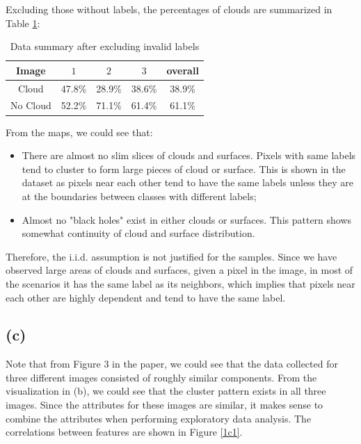 \documentclass[11pt]{article}
\theoremstyle{definition}
\begin{document}
Excluding those without labels, the percentages of clouds are summarized in Table \ref{tab2}:

\begin{table}[h]
    \centering
    \begin{tabular}{c||c|c|c|c}
    Image
    & $1$
    & $2$
    & $3$
    & overall \\
    \hline
    \hline
    Cloud
    & 47.8\%
    & 28.9\%
    & 38.6\% 
    & 38.9\% \\
    \hline
    No Cloud
    & 52.2\%
    & 71.1\%
    & 61.4\%
    & 61.1\%

    \end{tabular}
    \caption{Data summary after excluding invalid labels}
    \label{tab2}
\end{table}
\FloatBarrier

From the maps, we could see that:
\begin{itemize}
\item There are almost no slim slices of clouds and surfaces. Pixels with same labels tend to cluster to form large pieces of cloud or surface. This is shown in the dataset as pixels near each other tend to have the same labels unless they are at the boundaries between classes with different labels;

\item Almost no "black holes" exist in either clouds or surfaces. This pattern shows somewhat continuity of cloud and surface distribution.
\end{itemize}

Therefore, the i.i.d. assumption is not justified for the samples. Since we have observed large areas of clouds and surfaces, given a pixel in the image, in most of the scenarios it has the same label as its neighbors, which implies that pixels near each other are highly dependent and tend to have the same label.

\subsection*{(c)}

Note that from Figure 3 in the paper, we could see that the data collected for three different images consisted of roughly similar components. From the visualization in (b), we could see that the cluster pattern exists in all three images. Since the attributes for these images are similar, it makes sense to combine the attributes when performing exploratory data analysis. The correlations between features are shown in Figure \ref{1c1}.
\end{document}
